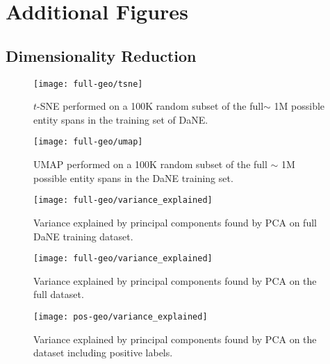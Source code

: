 \documentclass[main.tex]{subfiles}
\begin{document}
\chapter{Additional Figures}
\section{Dimensionality Reduction}
\label{sec:dimredu}

\begin{figure}[H]
    \centering
        \texttt{[image: full-geo/tsne]}
    \caption{
        $t$-SNE performed on a 100K random subset of the full$\sim$ 1M possible entity spans in the training set of DaNE.
    }
    \label{fig:full-tsne}
\end{figure}\noindent

\begin{figure}[H]
    \centering
        \texttt{[image: full-geo/umap]}
    \caption{
        UMAP performed on a 100K random subset of the full $\sim$ 1M possible entity spans in the DaNE training set.
    }
    \label{fig:full-umap}
\end{figure}\noindent

\begin{figure}[H]
    \centering
        \texttt{[image: full-geo/variance\_explained]}
    \caption{
        Variance explained by principal components found by PCA on full DaNE training dataset.
    }
    \label{fig:full-varex}
\end{figure}\noindent

\begin{figure}[H]
    \centering
        \texttt{[image: full-geo/variance\_explained]}
    \caption{
        Variance explained by principal components found by PCA on the full dataset.
    }
    \label{fig:full-varex}
\end{figure}\noindent

\begin{figure}[H]
    \centering
        \texttt{[image: pos-geo/variance\_explained]}
    \caption{
        Variance explained by principal components found by PCA on the dataset including positive labels.
    }
    \label{fig:pos-varex}
\end{figure}\noindent
\end{document}
